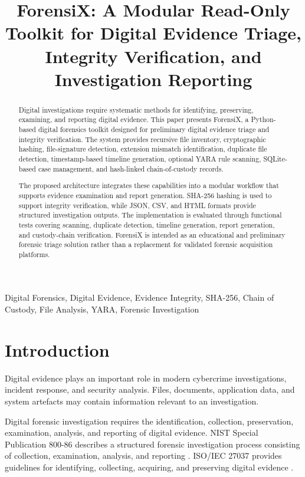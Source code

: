 \documentclass[conference]{IEEEtran}
\title{ForensiX: A Modular Read-Only Toolkit for Digital Evidence Triage, Integrity Verification, and Investigation Reporting}
\author{
\IEEEauthorblockN{Chethana Sri}
\IEEEauthorblockA{
Department of Computer Technology\\
Madras Institute of Technology, Anna University\\
Chennai, India
}
}
\begin{document}
\maketitle

\begin{abstract}
Digital investigations require systematic methods for identifying, preserving, examining, and reporting digital evidence. This paper presents ForensiX, a Python-based digital forensics toolkit designed for preliminary digital evidence triage and integrity verification. The system provides recursive file inventory, cryptographic hashing, file-signature detection, extension mismatch identification, duplicate file detection, timestamp-based timeline generation, optional YARA rule scanning, SQLite-based case management, and hash-linked chain-of-custody records.

The proposed architecture integrates these capabilities into a modular workflow that supports evidence examination and report generation. SHA-256 hashing is used to support integrity verification, while JSON, CSV, and HTML formats provide structured investigation outputs. The implementation is evaluated through functional tests covering scanning, duplicate detection, timeline generation, report generation, and custody-chain verification. ForensiX is intended as an educational and preliminary forensic triage solution rather than a replacement for validated forensic acquisition platforms.
\end{abstract}

\begin{IEEEkeywords}
Digital Forensics, Digital Evidence, Evidence Integrity, SHA-256, Chain of Custody, File Analysis, YARA, Forensic Investigation
\end{IEEEkeywords}

\section{Introduction}
Digital evidence plays an important role in modern cybercrime investigations, incident response, and security analysis. Files, documents, application data, and system artefacts may contain information relevant to an investigation.

Digital forensic investigation requires the identification, collection, preservation, examination, analysis, and reporting of digital evidence. NIST Special Publication 800-86 describes a structured forensic investigation process consisting of collection, examination, analysis, and reporting \cite{kent2006}. ISO/IEC 27037 provides guidelines for identifying, collecting, acquiring, and preserving digital evidence \cite{iso27037}.
\end{document}
